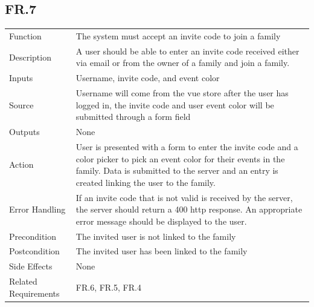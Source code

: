 \documentclass[12pt]{article}
\begin{document}
    \subsection*{FR.7}
    \begin{center}
        \begin{tabular}{| p{10em} p{26em} |}
        \hline
         Function & The system must accept an invite code to join a family\\
         Description & A user should be able to enter an invite code received either via email or from the owner of a family and join a family.\\
         Inputs & Username, invite code, and event color\\
         Source & Username will come from the vue store after the user has logged in, the invite code and user event color will be submitted through a form field\\
         Outputs & None\\
         Action & User is presented with a form to enter the invite code and a color picker to pick an event color for their events in the family. Data is submitted to the server and an entry is created linking the user to the family.\\
         Error Handling & If an invite code that is not valid is received by the server, the server should return a 400 http response. An appropriate error message should be displayed to the user.\\
         Precondition & The invited user is not linked to the family\\
         Postcondition & The invited user has been linked to the family\\
         Side Effects & None\\
         Related Requirements & FR.6, FR.5, FR.4\\
         \hline
        \end{tabular}
    \end{center}
\end{document}
